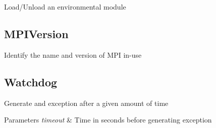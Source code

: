 Load/\-Unload an environmental module\hypertarget{group___utilities_MPIVersion}{}\subsection{M\-P\-I\-Version}\label{group___utilities_MPIVersion}
Identify the name and version of M\-P\-I in-\/use\hypertarget{group___utilities_Watchdog}{}\subsection{Watchdog}\label{group___utilities_Watchdog}
Generate and exception after a given amount of time 
\begin{DoxyParams}{Parameters}
{\em timeout} & Time in seconds before generating exception \\
\hline
\end{DoxyParams}
